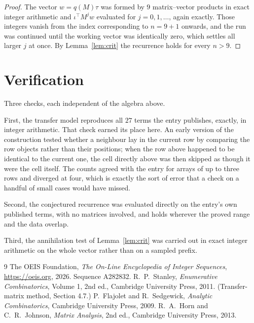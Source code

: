 \documentclass[11pt,a4paper]{article}
\theoremstyle{plain}
\theoremstyle{definition}
\begin{document}
\begin{proof}
The vector $w=q(M)\tau$ was formed by $9$ matrix--vector products in exact integer
arithmetic and $\iota^{\!\top}M^{j}w$ evaluated for $j=0,1,\dots$, again exactly. Those
integers vanish from the index corresponding to $n=9+1$ onwards, and the run was
continued until the working vector was identically zero, which settles all larger $j$ at once.
By Lemma~\ref{lem:crit} the recurrence holds for every $n>9$.
\end{proof}

\section{Verification}

Three checks, each independent of the algebra above.

First, the transfer model reproduces all $27$ terms the entry publishes, exactly, in
integer arithmetic. That check earned its place here. An early version of the construction
tested whether a neighbour lay in the current row by comparing the row objects rather
than their positions; when the row above happened to be identical to the current one, the
cell directly above was then skipped as though it were the cell itself. The counts agreed with
the entry for arrays of up to three rows and diverged at four, which is exactly the sort of
error that a check on a handful of small cases would have missed.

Second, the conjectured recurrence was evaluated directly on the entry's own published terms,
with no matrices involved, and holds wherever the proved range and the data overlap.

Third, the annihilation test of Lemma~\ref{lem:crit} was carried out in exact integer
arithmetic on the whole vector rather than on a sampled prefix.

\begin{thebibliography}{9}
 The OEIS Foundation, \emph{The On-Line Encyclopedia of Integer
Sequences}, \url{https://oeis.org}, 2026. Sequence A282832.
 R.~P.~Stanley, \emph{Enumerative Combinatorics}, Volume 1, 2nd ed.,
Cambridge University Press, 2011. (Transfer-matrix method, Section 4.7.)
 P.~Flajolet and R.~Sedgewick, \emph{Analytic Combinatorics}, Cambridge
University Press, 2009.
 R.~A.~Horn and C.~R.~Johnson, \emph{Matrix Analysis}, 2nd ed., Cambridge
University Press, 2013.
\end{thebibliography}
\end{document}

